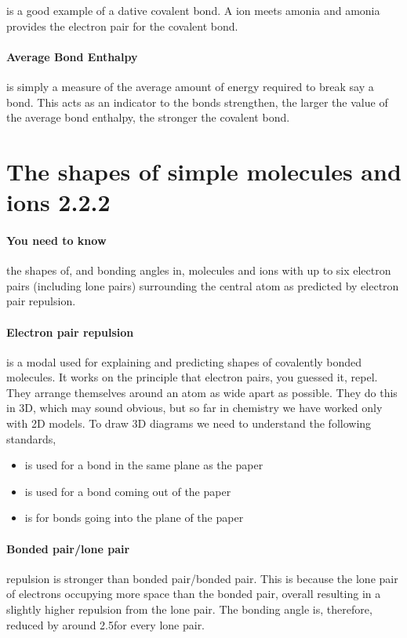 \documentclass[11pt,a4paper]{memoir}
\begin{document}
	 is a good example of a dative covalent bond. A  ion meets amonia and amonia provides the electron pair for the covalent bond.
	
	\paragraph{Average Bond Enthalpy} is simply a measure of the average amount of energy required to break say a  bond. This acts as an indicator to the bonds strengthen, the larger the value of the average bond enthalpy, the stronger the covalent bond.
	
\section{The shapes of simple molecules and ions 2.2.2}
	
	\paragraph{You need to know} the shapes of, and bonding angles in, molecules and ions with up to six electron pairs (including lone pairs) surrounding the central atom as predicted by electron pair repulsion.
	
	\paragraph{Electron pair repulsion} is a modal used for explaining and predicting shapes of covalently bonded molecules. It works on the principle that electron pairs, you guessed it, repel. They arrange themselves around an atom as wide apart as possible. They do this in 3D, which may sound obvious, but so far in chemistry we have worked only with 2D models. To draw 3D diagrams we need to understand the following standards,
	\begin{itemize}
		\item {} is used for a bond in the same plane as the paper
		\item {} is used for a bond coming out of the paper
		\item {} is for bonds going into the plane of the paper
	\end{itemize}
	
	\paragraph{Bonded pair/lone pair} repulsion is stronger than bonded pair/bonded pair. This is because the lone pair of electrons occupying more space than the bonded pair, overall resulting in a slightly higher repulsion from the lone pair. The bonding angle is, therefore, reduced by around 2.5\degree for every lone pair.
	
\end{document}
